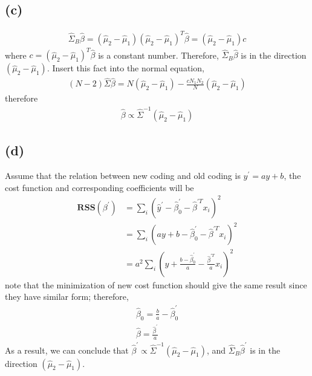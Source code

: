 \documentclass[pra,groupedaddress,amsmath,amssymb, column]{revtex4}
\begin{document}
\subsection*{(c)}
\begin{align}
\hat{\Sigma}_B\hat\beta= (\hat\mu_2-\hat\mu_1)(\hat\mu_2-\hat\mu_1)^T \hat\beta=(\hat\mu_2-\hat\mu_1)c
\end{align}
where $c = (\hat\mu_2-\hat\mu_1)^T \hat\beta$ is a constant number. Therefore, $\hat{\Sigma}_B\hat\beta$ is in the direction $ (\hat\mu_2-\hat\mu_1)$. Insert this fact into the normal equation, 
\begin{align}
(N-2)\hat{\Sigma} \hat\beta = N(\hat\mu_2-\hat\mu_1) - \frac{cN_1N_2}{N} (\hat\mu_2-\hat\mu_1)  
\end{align}
therefore 
\begin{align}
 \hat\beta \propto \hat{\Sigma}^{-1}(\hat\mu_2-\hat\mu_1)   
\end{align}
\subsection*{(d)}
Assume that the relation between new coding and old coding is $y^\prime = ay+b$, the cost function and corresponding coefficients will be
\begin{align}
\mathbf{RSS}(\beta^\prime) &= \sum_i (\hat y^\prime -\hat \beta_0^\prime - \hat\beta^{\prime T}x_i )^2\\
&=\sum_i ( ay + b - \hat\beta_0^\prime - \hat\beta^{\prime T}x_i  )^2 \\
&= a^2\sum_i ( y + \frac{b-\hat\beta_0^\prime }{a} - \frac{\hat\beta^{\prime T}}{a}x_i  )^2
\end{align}
note that the minimization of new cost function should give the same result since they have similar form; therefore, 
\begin{align}
\hat\beta_0 = \frac{b}{a}-\hat\beta_0^\prime \\
\hat\beta = \frac{\hat\beta^\prime}{a}
\end{align}
As a result, we can conclude that  $\hat\beta^\prime \propto \hat{\Sigma}^{-1}(\hat\mu_2-\hat\mu_1)  $, and  $\hat\Sigma_B\hat\beta^\prime $ is in the direction $(\hat\mu_2 - \hat\mu_1)$.
\end{document}
